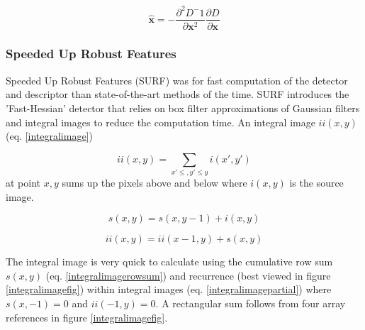 \documentclass[english,12pt,a4paper,pdftex,elec,utf8, table]{aaltothesis}
\begin{document}
\begin{equation}\label{keypointoffset}
\hat{\boldsymbol{x}} = - \frac{\partial^2D^-1}{\partial \boldsymbol{x}^2}\frac{\partial D}{\partial \boldsymbol{x}}
\end{equation}\cite{Lowe2004}

\subsubsection{Speeded Up Robust Features}
Speeded Up Robust Features (SURF) was for fast computation of the detector and descriptor than state-of-the-art methods of the time. SURF introduces the 'Fast-Hessian' detector that relies on box filter approximations of Gaussian filters and integral images to reduce the computation time. \cite{Bay2006} An integral image $ii(x,y)$ (eq. \ref{integralimage})

\begin{equation}
  \label{integralimage}
ii(x,y) = \sum\limits_{x'\le,y'\le y} i(x', y')
\end{equation}
at point $x, y$ sums up the pixels above and below where $i(x,y)$ is the source image. \cite{Viola2001}

\begin{equation}
  \label{integralimagerowsum}
s(x,y) = s(x, y - 1) + i(x,y)
\end{equation}

\begin{equation}
  \label{integralimagepartial}
  ii(x,y) = ii(x-1,y) + s(x,y)
\end{equation}

The integral image is very quick to calculate using the cumulative row sum $s(x,y)$ (eq. \ref{integralimagerowsum}) and recurrence (best viewed in figure \ref{integralimagefig}) within integral images (eq. \ref{integralimagepartial}) where $s(x, -1) = 0$ and $ii(-1,y)=0$. A rectangular sum follows from four array references in figure \ref{integralimagefig}.
\end{document}
